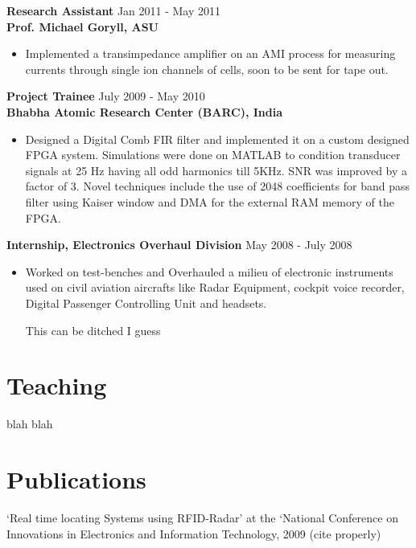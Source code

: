 \documentclass[margin]{res}
\begin{document}
\begin{resume}
{\bf Research Assistant} \hfill Jan 2011 - May 2011\\
{\bf Prof. Michael Goryll, ASU}
\begin{itemize}
	\item Implemented a transimpedance amplifier on an AMI process for measuring currents through single ion channels of cells, soon to be sent for tape out.
\end{itemize}
 
{\bf Project Trainee} \hfill July 2009 - May 2010\\
{\bf Bhabha Atomic Research Center (BARC), India}
\begin{itemize} 
	\item Designed a Digital Comb FIR filter and implemented it on a custom designed FPGA system. Simulations were done on MATLAB to condition transducer signals at 25 Hz having all odd harmonics till 5KHz. SNR was improved by a factor of 3. Novel techniques include the use of 2048 coefficients for band pass filter using Kaiser window and DMA for the external RAM memory of the FPGA.
\end{itemize} 

{\bf Internship, Electronics Overhaul Division} \hfill May 2008 - July 2008\\
\begin{itemize} 
	\item Worked on test-benches and Overhauled a milieu of electronic instruments used on civil aviation aircrafts like Radar Equipment, cockpit voice recorder, Digital Passenger Controlling Unit and headsets.
	
	This can be ditched I guess
\end{itemize}

\section{Teaching}
blah blah
\section{Publications}
‘Real time locating Systems using RFID-Radar’ at the ‘National Conference on Innovations in Electronics and Information Technology, 2009 (cite properly)


\end{resume}
\end{document}
